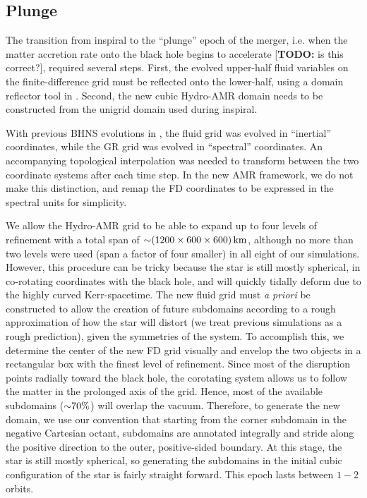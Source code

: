 \subsection{Plunge}  
The transition from inspiral to the ``plunge'' epoch of the merger, i.e. when the matter accretion rate onto the black hole begins to accelerate [\textbf{TODO:} is this correct?], required several steps.  First, the evolved upper-half fluid variables on the finite-difference grid must be reflected onto the lower-half, using a domain reflector tool in \SpEC.  Second, the new cubic Hydro-AMR domain needs to be constructed from the unigrid domain used during inspiral.

With previous BHNS evolutions in \SpEC, the fluid grid was evolved in ``inertial'' coordinates, while the GR grid was evolved in ``spectral'' coordinates.  An accompanying topological interpolation was needed to transform between the two coordinate systems after each time step.
In the new AMR framework, we do not make this distinction, and remap the FD coordinates to be expressed in the spectral units for simplicity. 

We allow the Hydro-AMR grid to be able to expand up to four levels of refinement with a total span of $\mathord{\sim}(1200 \times 600 \times 600)\, \textrm{km}$, although no more than two levels were used (span a factor of four smaller) in all eight of our simulations.
However, this procedure can be tricky because the star is still mostly spherical, in co-rotating coordinates with the black hole, and will quickly tidally deform due to the highly curved Kerr-spacetime.
The new fluid grid must \textit{a priori} be constructed to allow the creation of future subdomains according to a rough approximation of how the star will distort (we treat previous simulations as a rough prediction), given the symmetries of the system.
To accomplish this, we determine the center of the new FD grid visually and envelop the two objects in a rectangular box with the finest level of refinement.  
Since most of the disruption points radially toward the black hole, the corotating system allows us to follow the matter in the prolonged axis of the grid.
Hence, most of the available subdomains ($\mathord{\sim} 70\%$) will overlap the vacuum.  
Therefore, to generate the new domain, we use our convention that starting from the corner subdomain in the negative Cartesian octant, subdomains are annotated integrally and stride along the positive direction to the outer, positive-sided boundary.
At this stage, the star is still mostly spherical, so generating the subdomains in the initial cubic configuration of the star is fairly straight forward.
This epoch lasts between $1 - 2$ orbits.

